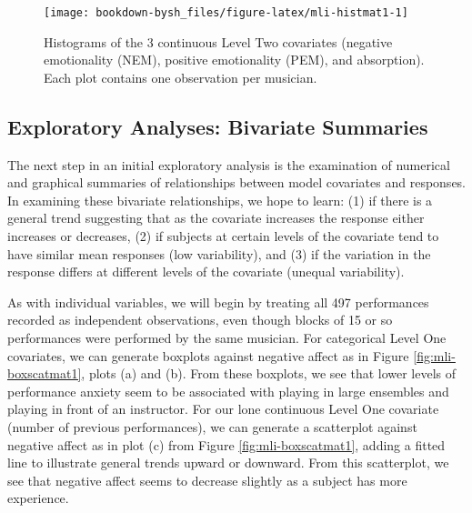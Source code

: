 \documentclass[
]{krantz}
\begin{document}
\begin{figure}

{\centering \texttt{[image: bookdown-bysh\_files/figure-latex/mli-histmat1-1]} 

}

\caption{Histograms of the 3 continuous Level Two covariates (negative emotionality (NEM), positive emotionality (PEM), and absorption).  Each plot contains one observation per musician.}\label{fig:mli-histmat1}
\end{figure}

\hypertarget{explore2}{%
\subsection{Exploratory Analyses: Bivariate Summaries}\label{explore2}}

The next step in an initial exploratory analysis is the examination of numerical and graphical summaries of relationships between model covariates and responses. In examining these bivariate relationships, we hope to learn: (1) if there is a general trend suggesting that as the covariate increases the response either increases or decreases, (2) if subjects at certain levels of the covariate tend to have similar mean responses (low variability), and (3) if the variation in the response differs at different levels of the covariate (unequal variability).

As with individual variables, we will begin by treating all 497 performances recorded as independent observations, even though blocks of 15 or so performances were performed by the same musician. For categorical Level One covariates, we can generate boxplots against negative affect as in Figure \ref{fig:mli-boxscatmat1}, plots (a) and (b). From these boxplots, we see that lower levels of performance anxiety seem to be associated with playing in large ensembles and playing in front of an instructor. For our lone continuous Level One covariate (number of previous performances), we can generate a scatterplot against negative affect as in plot (c) from Figure \ref{fig:mli-boxscatmat1}, adding a fitted line to illustrate general trends upward or downward. From this scatterplot, we see that negative affect seems to decrease slightly as a subject has more experience.
\end{document}
